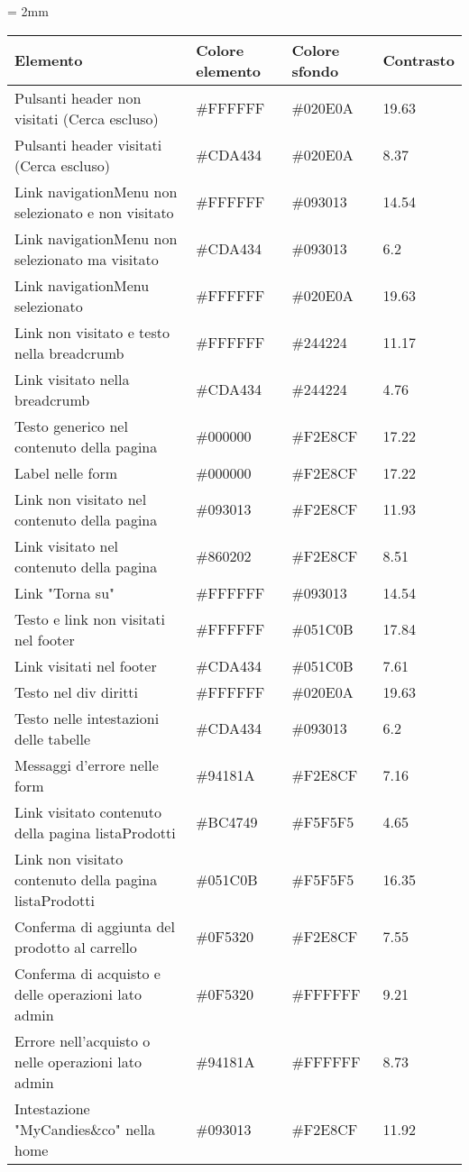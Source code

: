 \tabulinesep = 2mm
\begin{longtabu} to \textwidth {|X[0.4, c m]|X[0.1, c ]|X[0.1, c ]|X[0.1, c ]|}
\hline
\textbf{Elemento} & \textbf{Colore elemento} & \textbf{Colore sfondo} & \textbf{Contrasto}  \\ \hline

    Pulsanti header non visitati (Cerca escluso) & \#FFFFFF & \#020E0A & 19.63  \\ \hline
    Pulsanti header visitati (Cerca escluso) & \#CDA434 & \#020E0A & 8.37  \\ \hline
    Link navigationMenu non selezionato e non visitato & \#FFFFFF & \#093013 & 14.54  \\ \hline
    Link navigationMenu non selezionato ma visitato & \#CDA434 & \#093013 & 6.2  \\ \hline
    Link navigationMenu selezionato & \#FFFFFF & \#020E0A & 19.63  \\ \hline
    Link non visitato e testo nella breadcrumb & \#FFFFFF & \#244224 & 11.17  \\ \hline
    Link visitato nella breadcrumb & \#CDA434 & \#244224 & 4.76  \\ \hline
    Testo generico nel contenuto della pagina & \#000000 & \#F2E8CF  & 17.22 \\ \hline
    Label nelle form & \#000000 & \#F2E8CF  & 17.22 \\ \hline
    Link non visitato nel contenuto della pagina & \#093013 & \#F2E8CF  & 11.93 \\ \hline
    Link visitato nel contenuto della pagina & \#860202 & \#F2E8CF  & 8.51 \\ \hline
    Link "Torna su" & \#FFFFFF & \#093013 & 14.54  \\ \hline
    Testo e link non visitati nel footer & \#FFFFFF & \#051C0B & 17.84 \\ \hline
    Link visitati nel footer & \#CDA434 & \#051C0B & 7.61 \\ \hline
    Testo nel div diritti & \#FFFFFF & \#020E0A & 19.63 \\ \hline
    Testo nelle intestazioni delle tabelle & \#CDA434 & \#093013 & 6.2  \\ \hline
    Messaggi d'errore nelle form & \#94181A & \#F2E8CF  & 7.16 \\ \hline
    Link visitato contenuto della pagina listaProdotti & \#BC4749 & \#F5F5F5 & 4.65 \\ \hline
    Link non visitato contenuto della pagina listaProdotti & \#051C0B & \#F5F5F5 & 16.35 \\ \hline
    Conferma di aggiunta del prodotto al carrello & \#0F5320 & \#F2E8CF  & 7.55\\ \hline
    Conferma di acquisto e delle operazioni lato admin & \#0F5320 & \#FFFFFF & 9.21 \\ \hline
    Errore nell'acquisto o nelle operazioni lato admin & \#94181A & \#FFFFFF & 8.73 \\ \hline
    Intestazione "MyCandies\&co" nella home & \#093013 & \#F2E8CF & 11.92 \\ \hline
\end{longtabu}
